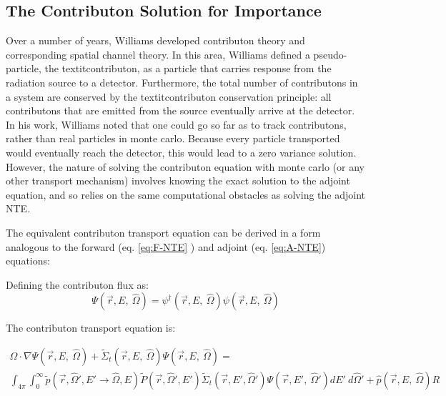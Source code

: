 \subsection{The Contributon Solution for Importance}
\label{sec:ContributonImportance}

Over a number of years, Williams \cite{williams_generalized_1991,williams_contributorn_1992,williams_contributon_study} developed contributon theory and corresponding spatial channel theory. In this area, Williams defined a pseudo-particle, the textit{contributon}, as a particle that carries response from the radiation source to a detector. Furthermore, the total number of contributons in a system are conserved by the textit{contributon conservation principle}: all contributons that are emitted from the source eventually arrive at the detector.  In his work, Williams noted that one could go so far as to track contributons, rather than real particles in monte carlo. Because every particle transported would eventually reach the detector, this would lead to a zero variance solution. However, the nature of solving the contributon equation with monte carlo (or any other transport mechanism) involves knowing the exact solution to the adjoint equation, and so relies on the same computational obstacles as solving the adjoint NTE.

The equivalent contributon transport equation can be derived in a form analogous to the forward (eq. \ref{eq:F-NTE} ) and adjoint (eq. \ref{eq:A-NTE}) equations:

Defining the contributon flux as:
\begin{equation}
\Psi (\vec {r} ,E,\:\hat\Omega) = \psi^{\dagger} (\vec {r} ,E,\:\hat\Omega) \psi(\vec {r} ,E,\:\hat\Omega)
\label{eq.Cont-Flux}
\end{equation}


The contributon transport equation is:

\begin{multline}
\hat\Omega \cdot \nabla \Psi (\vec {r} ,E,\:\hat\Omega)
+\widetilde{\Sigma} _{ t }(\vec{r},E,\:\hat\Omega)\Psi (\vec { r } ,E,\:\hat\Omega)
= \\
\int _{ 4\pi  } \int _{ 0 }^{ \infty  }
\widetilde{p}(\vec{r}, \hat\Omega', E'\rightarrow\hat\Omega, E)
\widetilde{P}(\vec{r}, \hat\Omega',E')
\widetilde{\Sigma} _{ t }(\vec{r}, E', \hat\Omega')
\Psi (\vec { r } ,E',\: \hat\Omega')dE' \:d\hat\Omega'
+ \hat p(\vec { r } ,E, \:\hat\Omega) R
\label{eq:Cont-NTE}
\end{multline}

